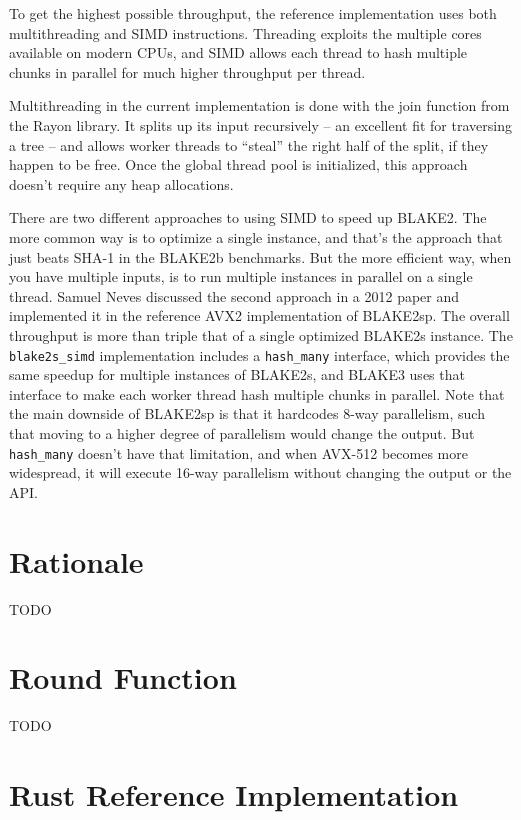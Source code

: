 \documentclass[11pt,notitlepage,a4paper]{article}
\begin{document}
To get the highest possible throughput, the reference implementation uses both multithreading and SIMD instructions. Threading exploits the multiple cores available on modern CPUs, and SIMD allows each thread to hash multiple chunks in parallel for much higher throughput per thread.

Multithreading in the current implementation is done with the join function from the Rayon library. It splits up its input recursively -- an excellent fit for traversing a tree -- and allows worker threads to ``steal'' the right half of the split, if they happen to be free. Once the global thread pool is initialized, this approach doesn't require any heap allocations.

There are two different approaches to using SIMD to speed up BLAKE2. The more common way is to optimize a single instance, and that's the approach that just beats SHA-1 in the BLAKE2b benchmarks. But the more efficient way, when you have multiple inputs, is to run multiple instances in parallel on a single thread. Samuel Neves discussed the second approach in a 2012 paper and implemented it in the reference AVX2 implementation of BLAKE2sp. The overall throughput is more than triple that of a single optimized BLAKE2s instance. The \texttt{blake2s\_simd} implementation includes a \texttt{hash\_many} interface, which provides the same speedup for multiple instances of BLAKE2s, and BLAKE3 uses that interface to make each worker thread hash multiple chunks in parallel. Note that the main downside of BLAKE2sp is that it hardcodes 8-way parallelism, such that moving to a higher degree of parallelism would change the output. But \texttt{hash\_many} doesn't have that limitation, and when AVX-512 becomes more widespread, it will execute 16-way parallelism without changing the output or the API.

\section{Rationale}\label{sec:rationale}

TODO

\nocite{*}



\begin{appendices}

\section{Round Function}\label{sec:roundfn}

TODO

\section{Rust Reference Implementation}\label{sec:referenceimpl}

\inputminted{rust}{reference_impl.rs}

\end{appendices}
\end{document}

